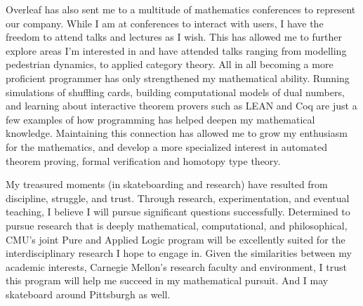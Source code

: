 \documentclass[11pt]{article}
\begin{document}
Overleaf has also sent me to a multitude of mathematics conferences to represent our company. While I am at conferences to interact with users, I have the freedom to attend talks and lectures as I wish. This has allowed me to further explore areas I'm interested in and have attended talks ranging from modelling pedestrian dynamics, to applied category theory. All in all becoming a more proficient programmer has only strengthened my mathematical ability. Running simulations of shuffling cards, building computational models of dual numbers, and learning about interactive theorem provers such as LEAN and Coq are just a few examples of how programming has helped deepen my mathematical knowledge. Maintaining this connection has allowed me to grow my enthusiasm for the mathematics, and develop a more specialized interest in automated theorem proving, formal verification and homotopy type theory.

My treasured moments (in skateboarding and research) have resulted from discipline, struggle, and trust. Through research, experimentation, and eventual teaching, I believe I will pursue significant questions successfully. Determined to pursue research that is deeply mathematical, computational, and philosophical, CMU's joint Pure and Applied Logic program will be excellently suited for the interdisciplinary research I hope to engage in. Given the similarities between my academic interests, Carnegie Mellon’s research faculty and environment, I trust this program will help me succeed in my mathematical pursuit. And I may skateboard around Pittsburgh as well.
\end{document}
